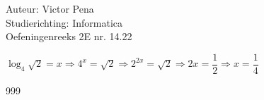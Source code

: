 \documentclass[a4paper]{article}
\begin{document}
	
	\noindent \large Auteur: Victor Pena \\
	\noindent \large Studierichting: Informatica\\
	\noindent \large Oefeningenreeks 2E nr. 14.22\\
	
	\medskip
	
	\normalsize 
	
	$\log_4\sqrt{2} = x \Rightarrow 4^x = \sqrt{2} \Rightarrow 2^{2x} = \sqrt{2} \Rightarrow 2x = \dfrac{1}{2} \Rightarrow x = \dfrac{1}{4}$   \\
	
	
	\begin{thebibliography}{999}
	\end{thebibliography}
\end{document}
